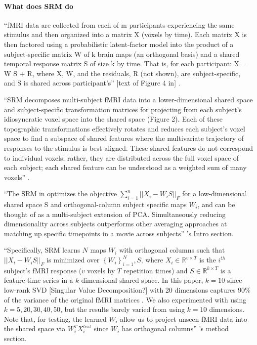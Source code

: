 \paragraph{What does SRM do}

``fMRI data are collected from each of m participants experiencing the same
stimulus and then organized into a matrix X (voxels by time). Each matrix X is
then factored using a probabilistic latent-factor model into the product of a
subject-specific matrix W of k brain maps (an orthogonal basis) and a shared
temporal response matrix S of size k by time. That is, for each participant: X =
W S + R, where X, W, and the residuals, R (not shown), are subject-specific, and
S is shared across participant's'' [text of Figure 4 in]
\citep{cohen2017computational}.

%
``SRM decomposes multi-subject fMRI data into a lower-dimensional shared space
and subject-specific transformation matrices for projecting from each subject's
idiosyncratic voxel space into the shared space (Figure 2). Each of these
topographic transformations effectively rotates and reduces each subject's voxel
space to find a subspace of shared features where the multivariate trajectory of
responses to the stimulus is best aligned. These shared features do not
correspond to individual voxels; rather, they are distributed across the full
voxel space of each subject; each shared feature can be understood as a weighted
sum of many voxels'' \citep{kumar2020brainiak}.

%
``The SRM in \citet{chen2015reduced} optimizes the objective
$\sum_{i=1}^{n}||X_{i}-W_{i}S||_{F}$ for a low-dimensional shared space S and
orthogonal-column subject specific maps $W_{i}$, and can be thought of as a
multi-subject extension of PCA.  Simultaneously reducing dimensionality across
subjects outperforms other averaging approaches at matching up specific
timepoints in a movie across subjects'' \citep{vodrahalli2018mapping}'s Intro
section.

``Specifically, SRM learns $N$ maps $W_{i}$ with orthogonal columns such that
$||X_{i}-W_{i}S||_{F}$ is minimized over $\left\{ W_{i}\right\} _{i=1}^{N},S$,
where $X_{i}\in\mathbb{R}^{v\times{T}}$ is the $i^{th}$ subject's fMRI response
($v$ voxels by $T$ repetition times) and $S\in\mathbb{R}^{k\times{T}}$ is a
feature time-series in a $k$-dimensional shared space. In this paper, $k=10$
since low-rank SVD [Singular Value Decomposition?] with 20 dimensions captures
90\% of the variance of the original fMRI matrices \citep{chen2015reduced}. We
also experimented with using $k=5,20,30,40,50$, but the results barely varied
from using $k=10$ dimensions.  Note that, for testing, the learned $W_{i}$ allow
us to project unseen fMRI data into the shared space via $W_{i}^{T}X_{i}^{test}$
since $W_{i}$ has orthogonal columns'' \citep{vodrahalli2018mapping}'s method
section.


